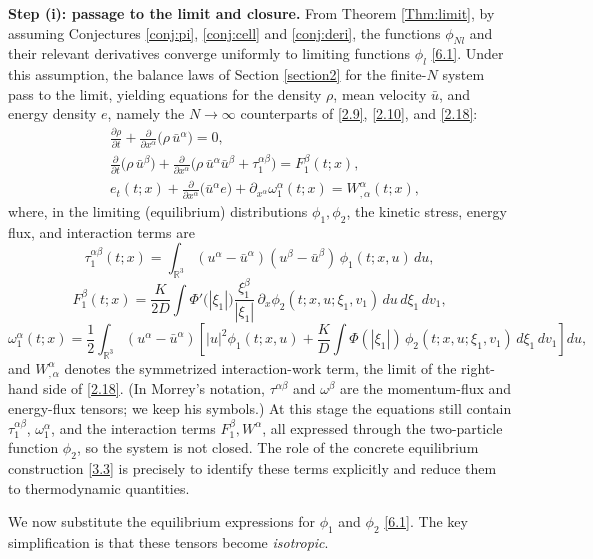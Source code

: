\documentclass[11pt]{article}
\begin{document}
\medskip
\noindent\textbf{Step (i): passage to the limit and closure.}
From Theorem \ref{Thm:limit}, by assuming Conjectures \ref{conj:pi}, \ref{conj:cell} and \ref{conj:deri}, the functions $\phi_{Nl}$ and their relevant derivatives converge uniformly to limiting functions $\phi_l$ \eqref{6.1}. Under this assumption, the balance laws of Section \ref{section2} for the finite-$N$ system pass to the limit, yielding equations for the density $\rho$, mean velocity $\bar u$, and energy density $e$, namely the $N\to\infty$ counterparts of \eqref{2.9}, \eqref{2.10}, and \eqref{2.18}:
\begin{align}
&\frac{\partial \rho}{\partial t}+\frac{\partial}{\partial x^\alpha}\big(\rho\,\bar u^\alpha\big)=0,
\tag{8.1a}\label{8.1a}\\[4pt]
&\frac{\partial}{\partial t}\big(\rho\,\bar u^\beta\big)
+\frac{\partial}{\partial x^\alpha}\big(\rho\,\bar u^\alpha \bar u^\beta+\tau_{1}^{\alpha\beta}\big)
=F_{1}^\beta(t;x),
\tag{8.1b}\label{8.1b}\\[4pt]
&e_{t}(t;x)
+\frac{\partial}{\partial x^\alpha}\big(\bar u^\alpha e\big)
+\partial_{x^\alpha}\omega_{1}^\alpha(t;x)
=W^\alpha_{,\alpha}(t;x),
\tag{8.1c}\label{8.1c}
\end{align}
where, in the limiting (equilibrium) distributions $\phi_1,\phi_2$, the kinetic stress, energy flux, and interaction terms are
\[
\tau_{1}^{\alpha\beta}(t;x)=\int_{\mathbb R^3}(u^\alpha-\bar u^\alpha)(u^\beta-\bar u^\beta)\,\phi_{1}(t;x,u)\,du,
\]
\[
F_{1}^\beta(t;x)
=\frac{K}{2D}\int
\Phi'\big(|\xi_1|\big)\frac{\xi_1^\beta}{|\xi_1|}\,
\partial_{x}\phi_{2}(t;x,u;\xi_1,v_1)\,du\,d\xi_1\,dv_1,
\]
\[
\omega_{1}^\alpha(t;x)
=\frac12\int_{\mathbb R^3}(u^\alpha-\bar u^\alpha)
\left[|u|^2\phi_{1}(t;x,u)
+\frac{K}{D}\int\Phi(|\xi_1|)\,\phi_{2}(t;x,u;\xi_1,v_1)\,d\xi_1\,dv_1\right]du,
\]
and $W^\alpha_{,\alpha}$ denotes the symmetrized interaction-work term, the limit of the right-hand side of \eqref{2.18}. (In Morrey's notation, $\tau^{\alpha\beta}$ and $\omega^\beta$ are the momentum-flux and energy-flux tensors; we keep his symbols.) At this stage the equations still contain $\tau_1^{\alpha\beta}$, $\omega_1^\alpha$, and the interaction terms $F_1^\beta,W^\alpha$, all expressed through the two-particle function $\phi_2$, so the system is not closed. The role of the concrete equilibrium construction \eqref{3.3} is precisely to identify these terms explicitly and reduce them to thermodynamic quantities.

We now substitute the equilibrium expressions for $\phi_1$ and $\phi_2$ \eqref{6.1}. The key simplification is that these tensors become \emph{isotropic}.
\end{document}
